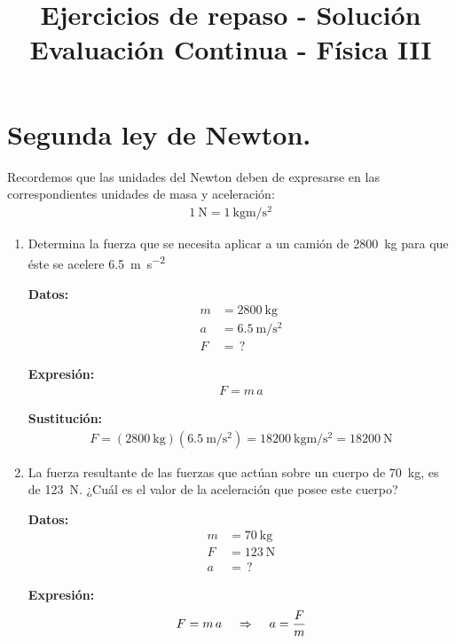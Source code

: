 \documentclass[14pt]{extarticle}
\title{\vspace*{-2cm} Ejercicios de repaso - Solución \\  Evaluación Continua - Física III\vspace{-5ex}}
\date{}
\begin{document}
\maketitle

\section{Segunda ley de Newton.}

Recordemos que las unidades del Newton deben de expresarse en las correspondientes unidades de masa y aceleración:
\begin{align*}
\SI{1}{\newton} = \SI[per-mode=fraction]{1}{\kilo\gram\meter\per\square\second}
\end{align*}

\begin{enumerate}
\item Determina la fuerza que se necesita aplicar a un camión de \SI{2800}{\kilo\gram} para que éste se acelere \SI{6.5}{\meter\per\square\second}

\begin{minipage}[t]{0.3\linewidth}
\textbf{Datos:}
\begin{align*}
m &= \SI{2800}{\kilo\gram} \\
a &= \SI{6.5}{\meter\per\square\second} \\
F &= \, ?
\end{align*}
\end{minipage}
\hspace{1cm}
\begin{minipage}[t]{0.3\linewidth}
\textbf{Expresión:}
\begin{align*}
F = m \, a
\end{align*}
\end{minipage}

\textbf{Sustitución:}
\begin{align*}
F =  (\SI{2800}{\kilo\gram}) \left( \SI[per-mode=fraction]{6.5}{\meter\per\square\second} \right) = \SI[per-mode=fraction]{18200}{\kilo\gram\meter\per\square\second} = \SI{18200}{\newton}
\end{align*}
\item La fuerza resultante de las fuerzas que actúan sobre un cuerpo de \SI{70}{\kilo\gram}, es de \SI{123}{\newton}. ¿Cuál es el valor de la aceleración que posee este cuerpo?

\begin{minipage}[t]{0.3\linewidth}
\textbf{Datos:}
\begin{align*}
m &= \SI{70}{\kilo\gram} \\
F &= \SI{123}{\newton} \\
a &= \, ?
\end{align*}
\end{minipage}
\hspace{1cm}
\begin{minipage}[t]{0.3\linewidth}
\textbf{Expresión:}
\begin{align*}
F = m \, a \hspace{0.4cm} \Rightarrow \hspace{0.4cm} a = \dfrac{F}{m}
\end{align*}
\end{minipage}


\end{enumerate}
\end{document}
